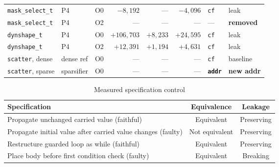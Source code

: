 \begin{table}[H]
\begin{tabular}{@{}llrrrrll@{}}
\texttt{mask\_select\_t} & P4       & O0     & $-8{,}192$   & ---        & $-4{,}096$  & \texttt{cf}   & leak \\
\texttt{mask\_select\_t} & P4       & O2     & ---          & ---        & ---         & ---           & \textbf{removed} \\
\texttt{dynshape\_t}     & P4       & O0     & $+106{,}703$ & $+8{,}233$ & $+24{,}595$ & \texttt{cf}   & leak \\
\texttt{dynshape\_t}     & P4       & O2     & $+12{,}391$  & $+1{,}194$ & $+4{,}631$  & \texttt{cf}   & leak \\
\hline
\texttt{scatter}, dense  & dense ref & O0 & --- & --- & --- & \texttt{cf}            & baseline \\
\texttt{scatter}, sparse & sparsifier & O0 & --- & --- & --- & \textbf{\texttt{addr}} & \textbf{new addr} \\
\hline
\end{tabular}
\end{table}

\begin{table}[H]
\caption{Measured specification control}
\label{tab:gate-controls}
\centering
\footnotesize
\setlength{\tabcolsep}{3pt}
\renewcommand{\arraystretch}{1.15}
\begin{tabular}{@{}>{\raggedright\arraybackslash}p{}cc@{}}
\hline
Specification & Equivalence & Leakage \\
\hline
Propagate unchanged carried value (faithful)                & Equivalent     & Preserving \\
Propagate initial value after carried value changes (faulty) & Not equivalent & Preserving \\
Restructure guarded loop as while (faithful)                & Equivalent     & Preserving \\
Place body before first condition check (faulty)            & Equivalent     & Breaking \\
\hline
\end{tabular}
\end{table}

